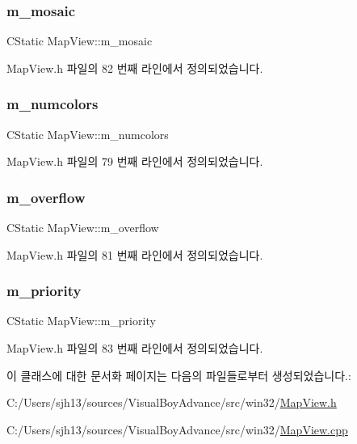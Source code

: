 \subsubsection{\texorpdfstring{m\+\_\+mosaic}{m\_mosaic}}
{\footnotesize\ttfamily C\+Static Map\+View\+::m\+\_\+mosaic}



Map\+View.\+h 파일의 82 번째 라인에서 정의되었습니다.

\mbox{\label{class_map_view_a211ea4eb337579e7193702ed2f20279c}} 
\subsubsection{\texorpdfstring{m\+\_\+numcolors}{m\_numcolors}}
{\footnotesize\ttfamily C\+Static Map\+View\+::m\+\_\+numcolors}



Map\+View.\+h 파일의 79 번째 라인에서 정의되었습니다.

\mbox{\label{class_map_view_a594a0ff999a2dd22853a45b584325543}} 
\subsubsection{\texorpdfstring{m\+\_\+overflow}{m\_overflow}}
{\footnotesize\ttfamily C\+Static Map\+View\+::m\+\_\+overflow}



Map\+View.\+h 파일의 81 번째 라인에서 정의되었습니다.

\mbox{\label{class_map_view_a3b5211e836b2d9b0124e0bcb71a49c3c}} 
\subsubsection{\texorpdfstring{m\+\_\+priority}{m\_priority}}
{\footnotesize\ttfamily C\+Static Map\+View\+::m\+\_\+priority}



Map\+View.\+h 파일의 83 번째 라인에서 정의되었습니다.



이 클래스에 대한 문서화 페이지는 다음의 파일들로부터 생성되었습니다.\+:\begin{DoxyCompactItemize}
\item 
C\+:/\+Users/sjh13/sources/\+Visual\+Boy\+Advance/src/win32/\mbox{\hyperlink{_map_view_8h}{Map\+View.\+h}}\item 
C\+:/\+Users/sjh13/sources/\+Visual\+Boy\+Advance/src/win32/\mbox{\hyperlink{_map_view_8cpp}{Map\+View.\+cpp}}\end{DoxyCompactItemize}
